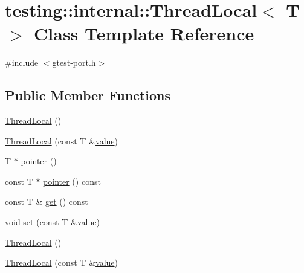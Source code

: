 \hypertarget{classtesting_1_1internal_1_1_thread_local}{}\section{testing\+::internal\+::Thread\+Local$<$ T $>$ Class Template Reference}
\label{classtesting_1_1internal_1_1_thread_local}


{\ttfamily \#include $<$gtest-\/port.\+h$>$}

\subsection*{Public Member Functions}
\begin{DoxyCompactItemize}
\item 
\mbox{\hyperlink{classtesting_1_1internal_1_1_thread_local_a106f3a3ad15d08f95f9887105d2a1af5}{Thread\+Local}} ()
\item 
\mbox{\hyperlink{classtesting_1_1internal_1_1_thread_local_a85610bdfdbc93a4c56215e0aad7da870}{Thread\+Local}} (const T \&\mbox{\hyperlink{_obj__test_2lib_2googletest-master_2googlemock_2test_2gmock-matchers__test_8cc_a337b8a670efc0b086ad3af163f3121b6}{value}})
\item 
T $\ast$ \mbox{\hyperlink{classtesting_1_1internal_1_1_thread_local_a882f57fed4b074de83693c0c0fe62858}{pointer}} ()
\item 
const T $\ast$ \mbox{\hyperlink{classtesting_1_1internal_1_1_thread_local_a57e45bb60e3cd94abb04fa449e9f0367}{pointer}} () const
\item 
const T \& \mbox{\hyperlink{classtesting_1_1internal_1_1_thread_local_ac56aeb97991824979bf192c63d1466f8}{get}} () const
\item 
void \mbox{\hyperlink{classtesting_1_1internal_1_1_thread_local_ab5ebc7ba07426cef7167afa2a7707eb4}{set}} (const T \&\mbox{\hyperlink{_obj__test_2lib_2googletest-master_2googlemock_2test_2gmock-matchers__test_8cc_a337b8a670efc0b086ad3af163f3121b6}{value}})
\item 
\mbox{\hyperlink{classtesting_1_1internal_1_1_thread_local_a106f3a3ad15d08f95f9887105d2a1af5}{Thread\+Local}} ()
\item 
\mbox{\hyperlink{classtesting_1_1internal_1_1_thread_local_a85610bdfdbc93a4c56215e0aad7da870}{Thread\+Local}} (const T \&\mbox{\hyperlink{_obj__test_2lib_2googletest-master_2googlemock_2test_2gmock-matchers__test_8cc_a337b8a670efc0b086ad3af163f3121b6}{value}})
\item 

\end{DoxyCompactItemize}
